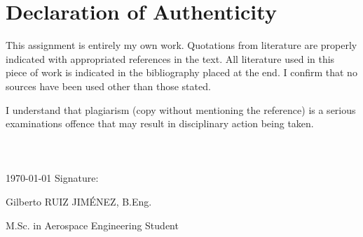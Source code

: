 \section*{Declaration of Authenticity}
This assignment is entirely my own work. Quotations from literature are properly indicated with appropriated references in the text. All literature used in this piece of work is indicated in the bibliography placed at the end. I confirm that no sources have been used other than those stated. \par 
I understand that plagiarism (copy without mentioning the reference) is a serious examinations offence that may result in disciplinary action being taken.
\\
\\
\\
\\
\today \hspace{6 pt} Signature: \hrulefill

\hspace*{0mm}\phantom{\today  Signature: }Gilberto RUIZ JIMÉNEZ, B.Eng.

\hspace*{0mm}\phantom{\today  Signature: }M.Sc. in Aerospace Engineering Student
